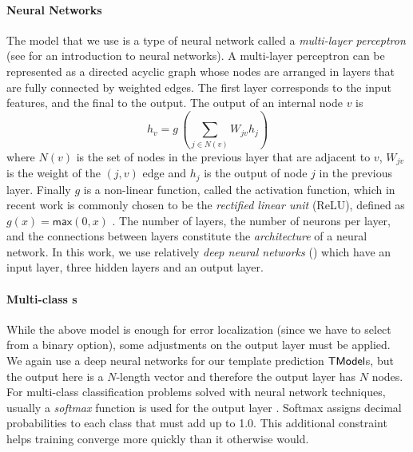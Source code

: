 \paragraph{Neural Networks}
The model that we use is a type of neural network called a \emph{multi-layer
perceptron} (see \citep{Nielsen2015-pu} for an introduction to neural networks).
A multi-layer perceptron can be represented as a directed acyclic graph whose
nodes are arranged in layers that are fully connected by weighted edges. The
first layer corresponds to the input features, and the final to the output. The
output of an internal node $v$ is
\[ h_v = g\,(\sum_{j \in N(v)}\!W_{jv} h_j ) \] where $N(v)$ is the set of nodes
in the previous layer that are adjacent to $v$, $W_{jv}$ is the weight of the
$(j, v)$ edge and $h_j$ is the output of node $j$ in the previous layer. Finally
$g$ is a non-linear function, called the activation function, which in recent
work is commonly chosen to be the \emph{rectified linear unit} (ReLU), defined
as $g(x) = \mathsf{max}(0,x)$ \citep{Nair2010-xg}. The number of layers, the
number of neurons per layer, and the connections between layers constitute the
\emph{architecture} of a neural network. In this work, we use relatively
\emph{deep neural networks} (\dnn) which have an input layer, three hidden
layers and an output layer.


\paragraph{Multi-class \dnn{}s}
While the above model is enough for error localization (since we have to select
from a binary option), some adjustments on the output layer must be applied. We
again use a deep neural networks for our template prediction $\mathsf{TModel}$s, but the
output here is a $N$-length vector and therefore the output layer has $N$ nodes.
For multi-class classification problems solved with neural network techniques,
usually a \emph{softmax} function is used for the output layer
\citep{Goodfellow-et-al-2016, Bishop-book-2006}. Softmax assigns decimal
probabilities to each class that must add up to 1.0. This additional constraint
helps training converge more quickly than it otherwise would.

